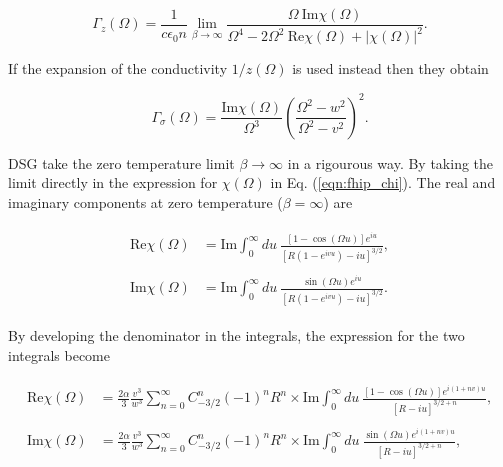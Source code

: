 \begin{equation}
    \Gamma_z(\Omega) = \frac{1}{c \epsilon_0 n} \lim_{\beta \to \infty} \frac{\Omega\ \textrm{Im}\chi(\Omega)}{\Omega^4 - 2 \Omega^2\ \textrm{Re} \chi(\Omega) + |\chi(\Omega)|^2}.
\end{equation}

If the expansion of the conductivity $1/z(\Omega)$ is used instead then they obtain

\begin{equation}
    \Gamma_\sigma(\Omega) = \frac{\text{Im}\chi(\Omega)}{\Omega^3} \left( \frac{\Omega^2 - w^2}{\Omega^2 -v^2} \right)^2.
\end{equation}

DSG take the zero temperature limit $\beta \to \infty$ in a rigourous way. By taking the limit directly in the expression for $\chi(\Omega)$ in Eq. (\ref{eqn:fhip_chi}). The real and imaginary components at zero temperature ($\beta = \infty$) are

\begin{subequations}
    \begin{align}
    \begin{split}
        \text{Re} \chi(\Omega) &= \text{Im} \int^{\infty}_0 du\ \frac{\left[1 - \cos(\Omega u)\right] e^{iu}}{\left[R(1-e^{ivu}) - iu\right]^{3/2}},
    \end{split}\\
    \begin{split}
        \text{Im} \chi(\Omega) &= \text{Im} \int^{\infty}_0 du\ \frac{\sin(\Omega u) e^{iu}}{\left[R(1-e^{ivu}) - iu\right]^{3/2}}.
    \end{split}
    \end{align}
\end{subequations}

By developing the denominator in the integrals, the expression for the two integrals become

\begin{subequations}
    \begin{align}
    \begin{split}
        \text{Re} \chi(\Omega) &= \frac{2\alpha}{3} \frac{v^3}{w^3} \sum_{n = 0}^\infty C^n_{-3/2} (-1)^n R^n \times \text{Im} \int^{\infty}_0 du\ \frac{\left[1 - \cos(\Omega u)\right] e^{i(1+nv)u}}{\left[R - iu\right]^{3/2 + n}},
    \end{split}\\
    \begin{split}\label{eqn:reX_exp}
        \text{Im} \chi(\Omega) &= \frac{2\alpha}{3} \frac{v^3}{w^3} \sum_{n = 0}^\infty C^n_{-3/2} (-1)^n R^n \times \text{Im} \int^{\infty}_0 du\ \frac{\sin(\Omega u) e^{i(1+nv)u}}{\left[R - iu\right]^{3/2 + n}},
    \end{split}
    \end{align}
\end{subequations}


